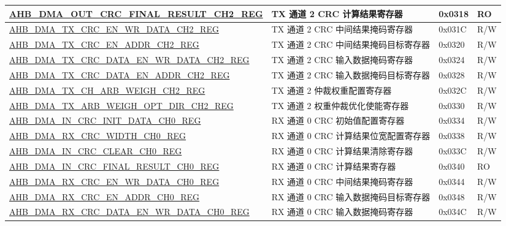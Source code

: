 \begin{longtable}{ | l | l | p{1.3cm} | l | }
\hyperref[regdesc:AHBDMAOUTCRCFINALRESULTCHNREG]{AHB\_DMA\_OUT\_CRC\_FINAL\_RESULT\_CH2\_REG} & TX 通道 2 CRC 计算结果寄存器 & 0x0318 & RO \\ \hline
\hyperref[regdesc:AHBDMATXCRCENWRDATACHNREG]{AHB\_DMA\_TX\_CRC\_EN\_WR\_DATA\_CH2\_REG} & TX 通道 2 CRC 中间结果掩码寄存器 & 0x031C & R/W \\ \hline
\hyperref[regdesc:AHBDMATXCRCENADDRCHNREG]{AHB\_DMA\_TX\_CRC\_EN\_ADDR\_CH2\_REG} & TX 通道 2 CRC 中间结果掩码目标寄存器 & 0x0320 & R/W \\ \hline
\hyperref[regdesc:AHBDMATXCRCDATAENWRDATACHNREG]{AHB\_DMA\_TX\_CRC\_DATA\_EN\_WR\_DATA\_CH2\_REG} & TX 通道 2 CRC 输入数据掩码寄存器 & 0x0324 & R/W \\ \hline
\hyperref[regdesc:AHBDMATXCRCDATAENADDRCHNREG]{AHB\_DMA\_TX\_CRC\_DATA\_EN\_ADDR\_CH2\_REG} & TX 通道 2 CRC 输入数据掩码目标寄存器 & 0x0328 & R/W \\ \hline
\hyperref[regdesc:AHBDMATXCHARBWEIGHCHNREG]{AHB\_DMA\_TX\_CH\_ARB\_WEIGH\_CH2\_REG} & TX 通道 2 仲裁权重配置寄存器 & 0x032C & R/W \\ \hline
\hyperref[regdesc:AHBDMATXARBWEIGHOPTDIRCHNREG]{AHB\_DMA\_TX\_ARB\_WEIGH\_OPT\_DIR\_CH2\_REG} & TX 通道 2 权重仲裁优化使能寄存器 & 0x0330 & R/W \\ \hline
\hyperref[regdesc:AHBDMAINCRCINITDATACHNREG]{AHB\_DMA\_IN\_CRC\_INIT\_DATA\_CH0\_REG} & RX 通道 0 CRC 初始值配置寄存器 & 0x0334 & R/W \\ \hline
\hyperref[regdesc:AHBDMARXCRCWIDTHCHNREG]{AHB\_DMA\_RX\_CRC\_WIDTH\_CH0\_REG} & RX 通道 0 CRC 计算结果位宽配置寄存器 & 0x0338 & R/W \\ \hline
\hyperref[regdesc:AHBDMAINCRCCLEARCHNREG]{AHB\_DMA\_IN\_CRC\_CLEAR\_CH0\_REG} & RX 通道 0 CRC 计算结果清除寄存器 & 0x033C & R/W \\ \hline
\hyperref[regdesc:AHBDMAINCRCFINALRESULTCHNREG]{AHB\_DMA\_IN\_CRC\_FINAL\_RESULT\_CH0\_REG} & RX 通道 0 CRC 计算结果寄存器 & 0x0340 & RO \\ \hline
\hyperref[regdesc:AHBDMARXCRCENWRDATACHNREG]{AHB\_DMA\_RX\_CRC\_EN\_WR\_DATA\_CH0\_REG} & RX 通道 0 CRC 中间结果掩码寄存器 & 0x0344 & R/W \\ \hline
\hyperref[regdesc:AHBDMARXCRCENADDRCHNREG]{AHB\_DMA\_RX\_CRC\_EN\_ADDR\_CH0\_REG} & RX 通道 0 CRC 输入数据掩码目标寄存器 & 0x0348 & R/W \\ \hline
\hyperref[regdesc:AHBDMARXCRCDATAENWRDATACHNREG]{AHB\_DMA\_RX\_CRC\_DATA\_EN\_WR\_DATA\_CH0\_REG} & RX 通道 0 CRC 输入数据掩码寄存器 & 0x034C & R/W \\ \hline

\end{longtable}
